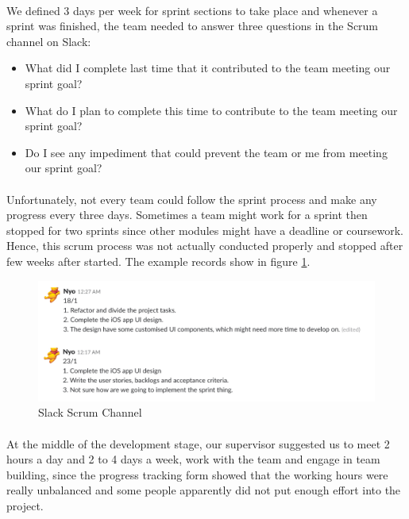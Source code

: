 \documentclass[12pt,a4paper]{article}
\begin{document}
          \paragraph{}We defined 3 days per week for sprint sections to take place and whenever a sprint was finished, the team needed to answer three questions in the Scrum channel on Slack:
          
          \begin{itemize}
            \item What did I complete last time that it contributed to the team meeting our sprint goal?
            \item What do I plan to complete this time to contribute to the team meeting our sprint goal?
            \item Do I see any impediment that could prevent the team or me from meeting our sprint goal?
          \end{itemize}    

          \paragraph{}Unfortunately, not every team could follow the sprint process and make any progress every three days. Sometimes a team might work for a sprint then stopped for two sprints since other modules might have a deadline or coursework. Hence, this scrum process was not actually conducted properly and stopped after few weeks after started. The example records show in figure \ref{fig:Slack Scrum Channel}. 

          \begin{figure}[H]
            \centering
            \includegraphics[width=1\textwidth]{../assets/development-records-slack-scrum-channel.png}
            \caption{Slack Scrum Channel}
            \label{fig:Slack Scrum Channel}
          \end{figure}
          
          \paragraph{}At the middle of the development stage, our supervisor suggested us to meet 2 hours a day and 2 to 4 days a week, work with the team and engage in team building, since the progress tracking form showed that the working hours were really unbalanced and some people apparently did not put enough effort into the project. 
          
\end{document}
